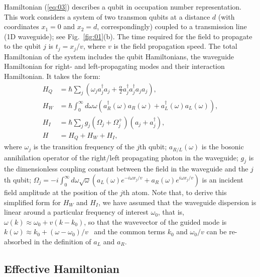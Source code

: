 \documentclass[lettersize,journal]{IEEEtran}
\begin{document}
Hamiltonian (\ref{eq:03}) describes a qubit in occupation number representation.
This work considers a system of two transmon qubits at a distance $d$ (with coordinates $x_1 = 0$ and $x_2 = d$, correspondingly)  coupled to a transmission line (1D waveguide); see Fig.~\ref{fig:01}(b).
The time required for the field to propagate to the qubit $j$ is $t_j = x_j / v$, where $v$ is the field propagation speed.
The total Hamiltonian of the system includes the qubit Hamiltonians, the waveguide Hamiltonian for right- and left-propagating modes and their interaction Hamiltonian.
It takes the form:
\begin{align} \label{eq:04}
    H_Q &= \hbar \sum_j \left( \omega_j a_j^\dag a_j + \frac{\alpha}{2} a_j^\dag a_j^\dag a_j a_j \right), \\
    H_W &= \hbar \int_0^\infty d \omega \omega \left( a_R^\dag(\omega) a_R(\omega) + a_L^\dag(\omega) a_L(\omega) \right), \\
    H_I &= \hbar \sum_j g_j (\Omega_j + \Omega_j^+) (a_j + a_j^\dag), \\
    H &= H_Q + H_W + H_I,
\end{align}
where $\omega_j$ is the transition frequency of the $j$th qubit; $a_{R/L}(\omega)$ is the bosonic annihilation operator of the right/left propagating photon in the waveguide; $g_j$ is the dimensionless coupling constant between the field in the waveguide and the $j$th qubit; $\Omega_j = - i \int_0^\infty d \omega \sqrt{\omega} \left( a_L(\omega) e^{-i \omega x_j / v} + a_R(\omega) e^{i \omega x_j / v} \right)$ is an incident field amplitude at the position of the $j$th atom.
Note that, to derive this simplified form for $H_W$ and $H_I$, we have assumed that the waveguide dispersion is linear around a particular frequency of interest $\omega_0$, that is, $\omega(k) \approx \omega_0 + v (k - k_0)$, so that the wavevector of the guided mode is $k(\omega) \approx k_0 + (\omega - \omega_0) / v$~\cite{shen_theory_2009} and the common terms $k_0$ and $\omega_0/v$ can be re-absorbed in the definition of $a_L$ and $a_R$.

\subsection{Effective Hamiltonian}
\end{document}
